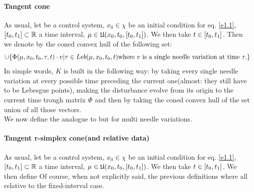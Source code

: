 \paragraph{Tangent cone} As usual, let \controlSystem be a control system, $x_0\in\chi$ be an initial condition for eq. \ref{e1.1}, $[t_0,t_1]\subset\mathbb{R}$ a time interval, $\mu\in\mathfrak{U}(x_0,t_0,[t_0,t_1])$. We then take $t\in[t_0,t_1]$. Then we denote by  the coned convex hull of the following set: 
\[ \cup \{ \Phi(\mu,x_0,t_0,\tau,t)\cdot v|\tau\in Leb(\mu,x_0,t_0,t)\text{where $v$ is a single needle variation at time }\tau. \} \]
In simple words, $K$ is built in the following way: by taking every single needle variation at every possible time preceding the current one(almost: they still have to be Lebesgue points), making the disturbance evolve from its origin to the current time trough matrix $\Phi$ and then by taking the coned convex hull of the set union of all those vectors. \\
We now define the analogue to  but for multi needle variations.

\paragraph{Tangent r-simplex cone(and relative data)} As usual, let \controlSystem be a control system, $x_0\in\chi$ be an initial condition for eq. \ref{e1.1}, $[t_0,t_1]\subset\mathbb{R}$ a time interval, $\mu\in\mathfrak{U}(x_0,t_0,[t_0,t_1])$. We then take $t\in[t_0,t_1]$. We then define 
Of course, when not explicitly said, the previous definitions where all relative to the fixed-interval case.

